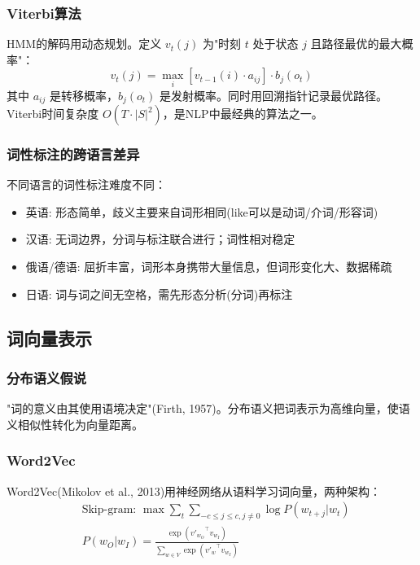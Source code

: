\subsubsection{Viterbi算法}

HMM的解码用动态规划。定义 $v_t(j)$ 为"时刻 $t$ 处于状态 $j$ 且路径最优的最大概率"：
\begin{equation}
    v_t(j) = \max_{i} [v_{t-1}(i) \cdot a_{ij}] \cdot b_j(o_t)
\end{equation}
其中 $a_{ij}$ 是转移概率，$b_j(o_t)$ 是发射概率。同时用回溯指针记录最优路径。Viterbi时间复杂度 $O(T \cdot |S|^2)$，是NLP中最经典的算法之一。

\subsubsection{词性标注的跨语言差异}

不同语言的词性标注难度不同：
\begin{itemize}
    \item 英语: 形态简单，歧义主要来自词形相同(like可以是动词/介词/形容词)
    \item 汉语: 无词边界，分词与标注联合进行；词性相对稳定
    \item 俄语/德语: 屈折丰富，词形本身携带大量信息，但词形变化大、数据稀疏
    \item 日语: 词与词之间无空格，需先形态分析(分词)再标注
\end{itemize}

\subsection{词向量表示}

\subsubsection{分布语义假说}

"词的意义由其使用语境决定"(Firth, 1957)。分布语义把词表示为高维向量，使语义相似性转化为向量距离。

\subsubsection{Word2Vec}

Word2Vec(Mikolov et al., 2013)用神经网络从语料学习词向量，两种架构：
\begin{equation}
    \begin{aligned}
    &\text{Skip-gram: } \max \sum_{t} \sum_{-c \leq j \leq c, j \neq 0} \log P(w_{t+j} | w_t) \\
    &P(w_O | w_I) = \frac{\exp({v'_{w_O}}^\top v_{w_I})}{\sum_{w \in V} \exp({v'_w}^\top v_{w_I})}
    \end{aligned}
\end{equation}

